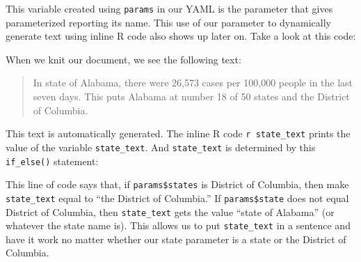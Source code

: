 \documentclass[
]{book}
\newenvironment{Shaded}{\begin{snugshade}}{\end{snugshade}}
\newcommand{\FunctionTok}[1]{\textcolor[rgb]{0.00,0.00,0.00}{#1}}
\newcommand{\InformationTok}[1]{\textcolor[rgb]{0.56,0.35,0.01}{\textbf{\textit{#1}}}}
\newcommand{\NormalTok}[1]{#1}
\newcommand{\OtherTok}[1]{\textcolor[rgb]{0.56,0.35,0.01}{#1}}
\newcommand{\SpecialCharTok}[1]{\textcolor[rgb]{0.00,0.00,0.00}{#1}}
\newcommand{\StringTok}[1]{\textcolor[rgb]{0.31,0.60,0.02}{#1}}
\begin{document}
This variable created using \texttt{params} in our YAML is the parameter that gives parameterized reporting its name. This use of our parameter to dynamically generate text using inline R code also shows up later on. Take a look at this code:

\begin{Shaded}
\end{Shaded}

When we knit our document, we see the following text:

\begin{quote}
In state of Alabama, there were 26,573 cases per 100,000 people in the last seven days. This puts Alabama at number 18 of 50 states and the District of Columbia.
\end{quote}

This text is automatically generated. The inline R code \texttt{\textasciigrave{}r\ state\_text\textasciigrave{}} prints the value of the variable \texttt{state\_text}. And \texttt{state\_text} is determined by this \texttt{if\_else()} statement:

\begin{Shaded}
\end{Shaded}

This line of code says that, if \texttt{params\$states} is District of Columbia, then make \texttt{state\_text} equal to ``the District of Columbia.'' If \texttt{params\$state} does not equal District of Columbia, then \texttt{state\_text} gets the value ``state of Alabama'' (or whatever the state name is). This allows us to put \texttt{state\_text} in a sentence and have it work no matter whether our state parameter is a state or the District of Columbia.
\end{document}
